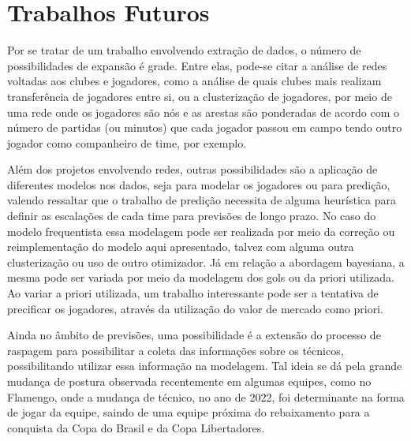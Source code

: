 \chapter{Trabalhos Futuros}

Por se tratar de um trabalho envolvendo extração de dados, o número de possibilidades de expansão é grade. Entre elas, pode-se citar a análise de redes voltadas aos clubes e jogadores, como a análise de quais clubes mais realizam transferência de jogadores entre si, ou a clusterização de jogadores, por meio de uma rede onde os jogadores são nós e as arestas são ponderadas de acordo com o número de partidas (ou minutos) que cada jogador passou em campo tendo outro jogador como companheiro de time, por exemplo.

Além dos projetos envolvendo redes, outras possibilidades são a aplicação de diferentes modelos nos dados, seja para modelar os jogadores ou para predição, valendo ressaltar que o trabalho de predição necessita de alguma heurística para definir as escalações de cada time para previsões de longo prazo. No caso do modelo frequentista essa modelagem pode ser realizada por meio da correção ou reimplementação do modelo aqui apresentado, talvez com alguma outra clusterização ou uso de outro otimizador. Já em relação a abordagem bayesiana, a mesma pode ser variada por meio da modelagem dos gols ou da priori utilizada. Ao variar a priori utilizada, um trabalho interessante pode ser a tentativa de precificar os jogadores, através da utilização do valor de mercado como priori.

Ainda no âmbito de previsões, uma possibilidade é a extensão do processo de raspagem para possibilitar a coleta das informações sobre os técnicos, possibilitando utilizar essa informação na modelagem. Tal ideia se dá pela grande mudança de postura observada recentemente em algumas equipes, como no Flamengo, onde a mudança de técnico, no ano de 2022, foi determinante na forma de jogar da equipe, saindo de uma equipe próxima do rebaixamento para a conquista da Copa do Brasil e da Copa Libertadores.
